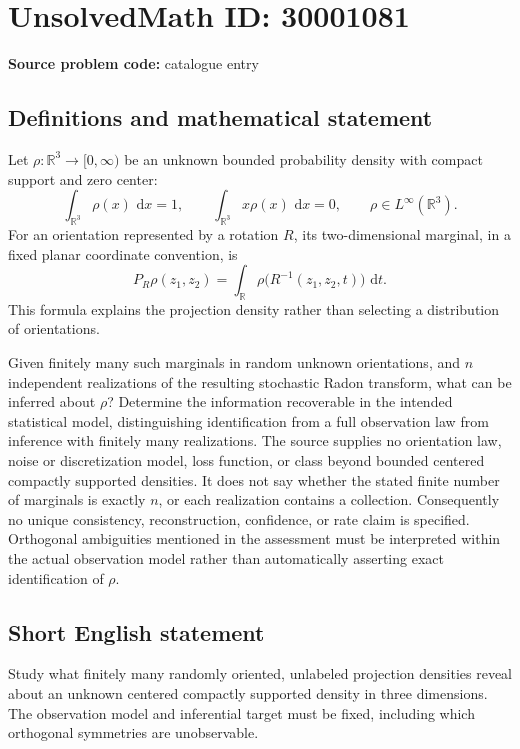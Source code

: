 \documentclass[11pt]{article}
\newcommand{\R}{\mathbb{R}}
\newcommand{\dd}{\,\mathrm{d}}
\begin{document}
\section*{UnsolvedMath ID: 30001081}
\textbf{Source problem code:} catalogue entry
\subsection{Definitions and mathematical statement}
Let \(\rho:\R^3\to[0,\infty)\) be an unknown bounded probability density with compact support and zero center:
\[
\int_{\R^3}\rho(x)\,\dd x=1,\qquad
\int_{\R^3}x\rho(x)\,\dd x=0,\qquad \rho\in L^\infty(\R^3).
\]
For an orientation represented by a rotation \(R\), its two-dimensional marginal, in a fixed planar coordinate convention, is
\[
P_R\rho(z_1,z_2)=\int_\R\rho\bigl(R^{-1}(z_1,z_2,t)\bigr)\,\dd t.
\]
This formula explains the projection density rather than selecting a distribution of orientations.

Given finitely many such marginals in random unknown orientations, and \(n\) independent realizations of the resulting stochastic Radon transform, what can be inferred about \(\rho\)? Determine the information recoverable in the intended statistical model, distinguishing identification from a full observation law from inference with finitely many realizations. The source supplies no orientation law, noise or discretization model, loss function, or class beyond bounded centered compactly supported densities. It does not say whether the stated finite number of marginals is exactly \(n\), or each realization contains a collection. Consequently no unique consistency, reconstruction, confidence, or rate claim is specified. Orthogonal ambiguities mentioned in the assessment must be interpreted within the actual observation model rather than automatically asserting exact identification of \(\rho\).
\subsection{Short English statement}
Study what finitely many randomly oriented, unlabeled projection densities reveal about an unknown centered compactly supported density in three dimensions. The observation model and inferential target must be fixed, including which orthogonal symmetries are unobservable.
\end{document}
